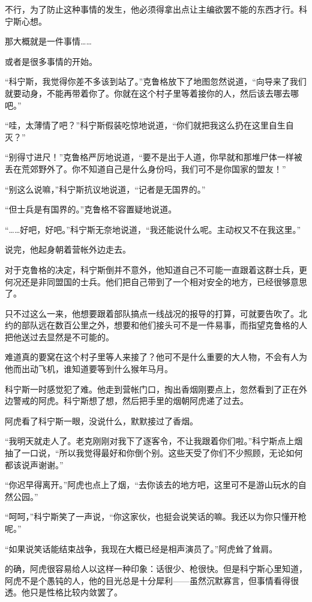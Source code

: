 不行，为了防止这种事情的发生，他必须得拿出点让主编欲罢不能的东西才行。科宁斯心想。

那大概就是一件事情……

或者是很多事情的开始。

“科宁斯，我觉得你差不多该到站了。”克鲁格放下了地图忽然说道，“向导来了我们就要动身，不能再带着你了。你就在这个村子里等着接你的人，然后该去哪去哪吧。”

“哇，太薄情了吧？”科宁斯假装吃惊地说道，“你们就把我这么扔在这里自生自灭？”

“别得寸进尺！”克鲁格严厉地说道，“要不是出于人道，你早就和那堆尸体一样被丢在荒郊野外了。你不知道自己是什么身份吗，我们可不是你国家的盟友！”

“别这么说嘛，”科宁斯抗议地说道，“记者是无国界的。”

“但士兵是有国界的。”克鲁格不容置疑地说道。

“……好吧，好吧。”科宁斯无奈地说道，“我还能说什么呢。主动权又不在我这里。”

说完，他起身朝着营帐外边走去。

对于克鲁格的决定，科宁斯倒并不意外，他知道自己不可能一直跟着这群士兵，更何况还是非同盟国的士兵。他们把自己带到了一个相对安全的地方，已经很够意思了。

只不过这么一来，他想要跟着部队搞点一线战况的报导的打算，可就要告吹了。北约的部队远在数百公里之外，想要和他们接头可不是一件易事，而指望克鲁格的人把他送过去显然是不可能的。

难道真的要窝在这个村子里等人来接了？他可不是什么重要的大人物，不会有人为他而出动飞机，谁知道要等到什么猴年马月。

科宁斯一时感觉犯了难。他走到营帐门口，掏出香烟刚要点上，忽然看到了正在外边警戒的阿虎。科宁斯想了想，然后把手里的烟朝阿虎递了过去。

阿虎看了科宁斯一眼，没说什么，默默接过了香烟。

“我明天就走人了。老克刚刚对我下了逐客令，不让我跟着你们啦。”科宁斯点上烟抽了一口说，“所以我觉得最好和你倒个别。这些天受了你们不少照顾，无论如何都该说声谢谢。”

“你迟早得离开。”阿虎也点上了烟，“去你该去的地方吧，这里可不是游山玩水的自然公园。”

“呵呵，”科宁斯笑了一声说，“你这家伙，也挺会说笑话的嘛。我还以为你只懂开枪呢。”

“如果说笑话能结束战争，我现在大概已经是相声演员了。”阿虎耸了耸肩。

的确，阿虎很容易给人以这样一种印象：话很少、枪很快。但是科宁斯心里知道，阿虎不是个愚钝的人，他的目光总是十分犀利——虽然沉默寡言，但事情看得很透。他只是性格比较内敛罢了。

